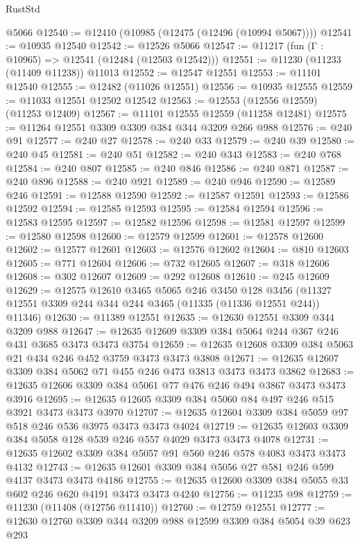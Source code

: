 \begin{lexlean}{RustStd}
\begin{coremodule}
{\begin{coremodule}
{{{{{{{{{{{{{{{{{{{{{{{{{{{{{{{{{{{{{{{{{{{{{{{{{{{{{{{{{{{{{{{{{{{{{{{{{{{{{{{{{{{{{    @5066
@12540 := @12410 (@10985 (@12475 (@12496 (@10994 @5067))))
@12541 := @10935 @12540
@12542 := @12526 @5066
@12547 := @11217 (fun (Γ : @10965) => @12541 (@12484 (@12503 @12542)))
@12551 := @11230 (@11233 (@11409 @11238)) @11013
@12552 := @12547 @12551
@12553 := @11101 @12540
@12555 := @12482 (@11026 @12551)
@12556 := @10935 @12555
@12559 := @11033 @12551 @12502 @12542
@12563 := @12553 (@12556 @12559) (@11253 @12409)
@12567 := @11101 @12555 @12559 (@11258 @12481)
@12575 := @11264 @12551 @3309 @3309 @384 @344 @3209 @266 @988
@12576 := @240 @91
@12577 := @240 @27
@12578 := @240 @33
@12579 := @240 @39
@12580 := @240 @45
@12581 := @240 @51
@12582 := @240 @343
@12583 := @240 @768
@12584 := @240 @807
@12585 := @240 @846
@12586 := @240 @871
@12587 := @240 @896
@12588 := @240 @921
@12589 := @240 @946
@12590 := @12589 @246
@12591 := @12588 @12590
@12592 := @12587 @12591
@12593 := @12586 @12592
@12594 := @12585 @12593
@12595 := @12584 @12594
@12596 := @12583 @12595
@12597 := @12582 @12596
@12598 := @12581 @12597
@12599 := @12580 @12598
@12600 := @12579 @12599
@12601 := @12578 @12600
@12602 := @12577 @12601
@12603 := @12576 @12602
@12604 := @810 @12603
@12605 := @771 @12604
@12606 := @732 @12605
@12607 := @318 @12606
@12608 := @302 @12607
@12609 := @292 @12608
@12610 := @245 @12609
@12629 := @12575
    @12610
    @3465
    @5065
    @246
    @3450
    @128
    @3456
    (@11327 @12551 @3309 @244 @344 @244 @3465 (@11335 (@11336 @12551 @244)) @11346)
@12630 := @11389 @12551
@12635 := @12630 @12551 @3309 @344 @3209 @988
@12647 := @12635 @12609 @3309 @384 @5064 @244 @367 @246 @431 @3685 @3473 @3473 @3754
@12659 := @12635 @12608 @3309 @384 @5063 @21 @434 @246 @452 @3759 @3473 @3473 @3808
@12671 := @12635 @12607 @3309 @384 @5062 @71 @455 @246 @473 @3813 @3473 @3473 @3862
@12683 := @12635 @12606 @3309 @384 @5061 @77 @476 @246 @494 @3867 @3473 @3473 @3916
@12695 := @12635 @12605 @3309 @384 @5060 @84 @497 @246 @515 @3921 @3473 @3473 @3970
@12707 := @12635 @12604 @3309 @384 @5059 @97 @518 @246 @536 @3975 @3473 @3473 @4024
@12719 := @12635 @12603 @3309 @384 @5058 @128 @539 @246 @557 @4029 @3473 @3473 @4078
@12731 := @12635 @12602 @3309 @384 @5057 @91 @560 @246 @578 @4083 @3473 @3473 @4132
@12743 := @12635 @12601 @3309 @384 @5056 @27 @581 @246 @599 @4137 @3473 @3473 @4186
@12755 := @12635 @12600 @3309 @384 @5055 @33 @602 @246 @620 @4191 @3473 @3473 @4240
@12756 := @11235 @98
@12759 := @11230 (@11408 (@12756 @11410))
@12760 := @12759 @12551
@12777 := @12630
    @12760
    @3309
    @344
    @3209
    @988
    @12599
    @3309
    @384
    @5054
    @39
    @623
    @293
}}}}}}}}}}}}}}}}}}}}}}}}}}}}}}}}}}}}}}}}}}}}}}}}}}}}}}}}}}}}}}}}}}}}}}}}}}}}}}}}}}}}}
\end{coremodule}}
\end{coremodule}
\end{lexlean}

